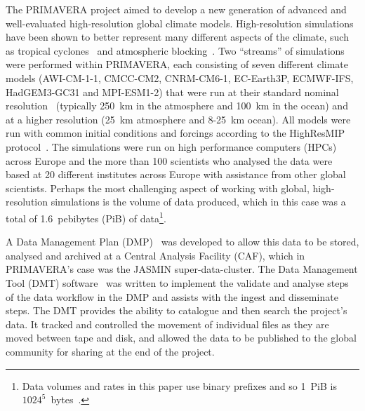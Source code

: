 \documentclass[gmd, manuscript]{copernicus}
\begin{document}


\introduction  %

The PRIMAVERA project aimed to develop a new generation of advanced and well-evaluated high-resolution global climate models. High-resolution simulations have been shown to better represent many different aspects of the climate, such as tropical cyclones~\citep{Roberts2020} and atmospheric blocking~\citep{Schiemann2019}. Two ``streams'' of simulations were performed within PRIMAVERA, each consisting of seven different climate models (AWI-CM-1-1, CMCC-CM2, CNRM-CM6-1, EC-Earth3P, ECMWF-IFS, HadGEM3-GC31 and MPI-ESM1-2) that were run at their standard nominal resolution~\citep{GloablAttr} (typically  250~km in the atmosphere and 100~km in the ocean) and at a higher resolution (25~km atmosphere and 8-25~km ocean). All models were run with common initial conditions and forcings according to the HighResMIP protocol~\citep{Haarsma2016}. The simulations were run on high performance computers (HPCs) across Europe and the more than 100 scientists who analysed the data were based at 20 different institutes across Europe with assistance from other global scientists. Perhaps the most challenging aspect of working with global, high-resolution simulations is the volume of data produced, which in this case was a total of 1.6~pebibytes (PiB) of data\footnote{Data volumes and rates in this paper use binary prefixes and so 1~PiB is $1024^5$~bytes~\citep{IEEE1541}.}. 

A Data Management Plan (DMP)~\citep{Mizielinski2016} was developed to allow this data to be stored, analysed and archived at a Central Analysis Facility (CAF), which in PRIMAVERA's case was the JASMIN super-data-cluster. The Data Management Tool (DMT) software~\citep{Seddon2019} was written to implement the validate and analyse steps of the data workflow in the DMP and assists with the ingest and disseminate steps. The DMT provides the ability to catalogue and then search the project's data. It tracked and controlled the movement of individual files as they are moved between tape and disk, and allowed the data to be published to the global community for sharing at the end of the project.
\end{document}
